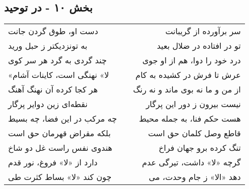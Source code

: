 \begin{center}
\section*{بخش ۱۰ - در توحید}
\label{sec:010}
\begin{longtable}{l p{0.5cm} r}
دست او، طوق گردن جانت
&&
سر برآورده از گریبانت
\\
به تونزدیکتر ز حبل ورید
&&
تو در افتاده در ضلال بعید
\\
چند گردی به گرد هر سر کوی
&&
درد خود را دوا، هم از او جوی
\\
«لا» نهنگی است، کاینات آشام
&&
عرش تا فرش در کشیده به کام
\\
هر کجا کرده آن نهنگ آهنگ
&&
از من و ما نه بوی ماند و نه رنگ
\\
نقطه‌ای زین دوایر پرگار
&&
نیست بیرون ز دور این پرگار
\\
چه مرکب در این فضا، چه بسیط
&&
هست حکم فنا، به جمله محیط
\\
بلکه مقراض قهرمان حق است
&&
قاطع وصل کلمان حق است
\\
هندوی نفس راست غل دو شاخ
&&
تنگ کرده برو جهان فراخ
\\
دارد از «لا» فروغ، نور قدم
&&
گرچه «لا» داشت، تیرگی عدم
\\
چون کند «لا» بساط کثرت طی
&&
دهد «الا» ز جام وحدت، می
\\
\end{longtable}
\end{center}
